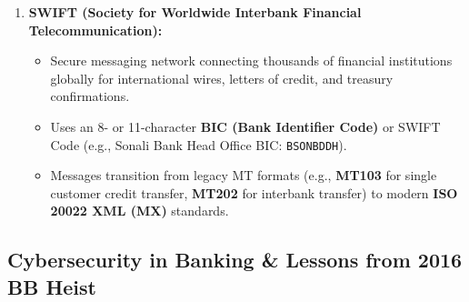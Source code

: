 \begin{enumerate}
\begin{itemize}
    \item Uses a Virtual Payment Address (VID) instead of exposing raw bank account or mobile numbers.
  \end{itemize}
  \item \textbf{SWIFT (Society for Worldwide Interbank Financial Telecommunication):}
  \begin{itemize}
    \item Secure messaging network connecting thousands of financial institutions globally for international wires, letters of credit, and treasury confirmations.
    \item Uses an 8- or 11-character \textbf{BIC (Bank Identifier Code)} or SWIFT Code (e.g., Sonali Bank Head Office BIC: \texttt{BSONBDDH}).
    \item Messages transition from legacy MT formats (e.g., \textbf{MT103} for single customer credit transfer, \textbf{MT202} for interbank transfer) to modern \textbf{ISO 20022 XML (MX)} standards.
  \end{itemize}
\end{enumerate}

\medskip

\subsection{Cybersecurity in Banking \& Lessons from 2016 BB Heist}

